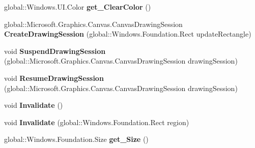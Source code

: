 \begin{DoxyCompactItemize}
global\+::\+Windows.\+U\+I.\+Color {\bfseries get\+\_\+\+Clear\+Color} ()
\item 
\mbox{\label{class_microsoft_1_1_graphics_1_1_canvas_1_1_u_i_1_1_xaml_1_1_canvas_virtual_control_afd788b24472d49a5bfc528818f1b2897}} 
global\+::\+Microsoft.\+Graphics.\+Canvas.\+Canvas\+Drawing\+Session {\bfseries Create\+Drawing\+Session} (global\+::\+Windows.\+Foundation.\+Rect update\+Rectangle)
\item 
\mbox{\label{class_microsoft_1_1_graphics_1_1_canvas_1_1_u_i_1_1_xaml_1_1_canvas_virtual_control_a67b34bbbcf4601ef850f26c26a0c3f54}} 
void {\bfseries Suspend\+Drawing\+Session} (global\+::\+Microsoft.\+Graphics.\+Canvas.\+Canvas\+Drawing\+Session drawing\+Session)
\item 
\mbox{\label{class_microsoft_1_1_graphics_1_1_canvas_1_1_u_i_1_1_xaml_1_1_canvas_virtual_control_a48ffbfafcaa20c4de29aee9bdec37dbd}} 
void {\bfseries Resume\+Drawing\+Session} (global\+::\+Microsoft.\+Graphics.\+Canvas.\+Canvas\+Drawing\+Session drawing\+Session)
\item 
\mbox{\label{class_microsoft_1_1_graphics_1_1_canvas_1_1_u_i_1_1_xaml_1_1_canvas_virtual_control_a091af64be3106bd03ef97245d58c8ef1}} 
void {\bfseries Invalidate} ()
\item 
\mbox{\label{class_microsoft_1_1_graphics_1_1_canvas_1_1_u_i_1_1_xaml_1_1_canvas_virtual_control_a14ac18c62a4e58078a3df49c2bd61e7d}} 
void {\bfseries Invalidate} (global\+::\+Windows.\+Foundation.\+Rect region)
\item 
\mbox{\label{class_microsoft_1_1_graphics_1_1_canvas_1_1_u_i_1_1_xaml_1_1_canvas_virtual_control_a43639e086b59c75cc4588187291b1539}} 
global\+::\+Windows.\+Foundation.\+Size {\bfseries get\+\_\+\+Size} ()
\item 
\mbox{\label{class_microsoft_1_1_graphics_1_1_canvas_1_1_u_i_1_1_xaml_1_1_canvas_virtual_control_aa905e71549d2ce0d69f0a79930bc36f7}} 

\end{DoxyCompactItemize}
